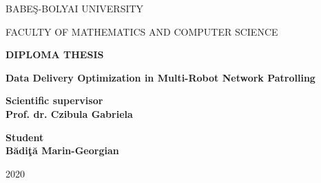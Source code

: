 \documentclass[a4paper, 12pt]{report}
\begin{document}
\begin{titlepage}
\sloppy
\begin{center}
\Large{BABE\c{S}-BOLYAI UNIVERSITY}

\Large{FACULTY OF MATHEMATICS AND COMPUTER SCIENCE}
\end{center}
\vspace{3.5 cm}
\begin{center}
\Huge \textbf{DIPLOMA THESIS}\\
\vspace{1 cm}

\huge \textbf{Data Delivery Optimization in Multi-Robot Network Patrolling}
\end{center}

\vspace{3.5cm}

\begin{flushleft}
\Large{\textbf{Scientific supervisor}}\\
\Large{\textbf{Prof. dr. Czibula Gabriela}}
\end{flushleft}

\vspace{1.5cm}

\begin{flushright}
\Large{\textbf{Student}}\\
\Large{\textbf{B\u adi\c t\u a Marin-Georgian}}
\end{flushright}


\vspace{2cm}
\begin{center}
\Large{2020}
\end{center}

\end{titlepage}
\end{document}
